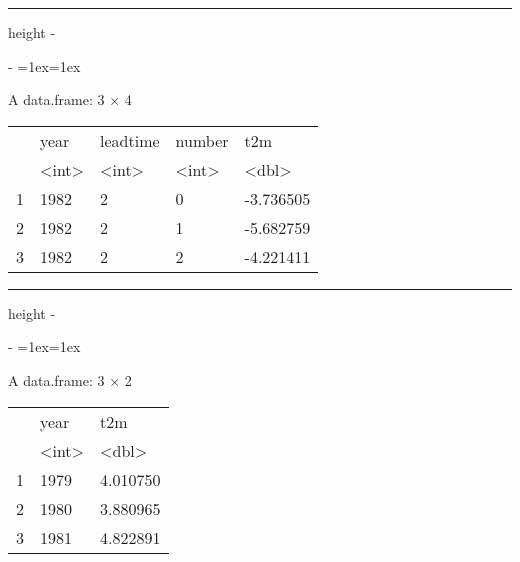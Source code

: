 \documentclass[letterpaper,10pt,english]{sphinxmanual}
\makeatletter
\newenvironment{nbsphinxfancyoutput}{%
    \let\sphinxincludegraphics\nbsphinxincludegraphics
    \nbsphinx@image@maxheight\textheight
    \advance\nbsphinx@image@maxheight -2\fboxsep   %
    \advance\nbsphinx@image@maxheight -2\fboxrule  %
    \advance\nbsphinx@image@maxheight -\baselineskip
\def\nbsphinxfcolorbox{\spx@fcolorbox{nbsphinx-code-border}{white}}%
\def\FrameCommand{\nbsphinxfcolorbox\nbsphinxfancyaddprompt\@empty}%
\def\FirstFrameCommand{\nbsphinxfcolorbox\nbsphinxfancyaddprompt\sphinxVerbatim@Continues}%
\def\MidFrameCommand{\nbsphinxfcolorbox\sphinxVerbatim@Continued\sphinxVerbatim@Continues}%
\def\LastFrameCommand{\nbsphinxfcolorbox\sphinxVerbatim@Continued\@empty}%
\MakeFramed{\advance\hsize-\width\@totalleftmargin\z@\linewidth\hsize\@setminipage}%
\lineskip=1ex\lineskiplimit=1ex\raggedright%
}{\par\unskip\@minipagefalse\endMakeFramed}
\def\nbsphinxfancyaddprompt{\ifvoid\nbsphinxpromptbox\else
    \kern\fboxrule\kern\fboxsep
    \copy\nbsphinxpromptbox
    \kern-\ht\nbsphinxpromptbox\kern-\dp\nbsphinxpromptbox
    \kern-\fboxsep\kern-\fboxrule\nointerlineskip
    \fi}
\newlength\nbsphinxcodecellspacing
\newcommand*{\nbsphinxincludegraphics}[2][]{%
    \gdef\spx@includegraphics@options{#1}%
    \setbox\spx@image@box\hbox{\texttt{[image: \#2]}}%
    \in@false
    \ifdim \wd\spx@image@box>\linewidth
      \g@addto@macro\spx@includegraphics@options{,width=\linewidth}%
      \in@true
    \fi
    \ifdim \ht\spx@image@box>\nbsphinx@image@maxheight
      \g@addto@macro\spx@includegraphics@options{,height=\nbsphinx@image@maxheight}%
      \in@true
    \fi
    \ifin@
      \g@addto@macro\spx@includegraphics@options{,keepaspectratio}%
    \fi
    \setbox\spx@image@box\box\voidb@x %
    \expandafter\includegraphics\expandafter[\spx@includegraphics@options]{#2}%
}%
\makeatother
\begin{document}
\hrule height -\fboxrule\relax
\vspace{\nbsphinxcodecellspacing}

\makeatletter\setbox\nbsphinxpromptbox\box\voidb@x\makeatother

\begin{nbsphinxfancyoutput}
A data.frame: 3 × 4
\begin{tabular}{r|llll}
  & year & leadtime & number & t2m\\
  & <int> & <int> & <int> & <dbl>\\
\hline
    1 & 1982 & 2 & 0 & -3.736505\\
    2 & 1982 & 2 & 1 & -5.682759\\
    3 & 1982 & 2 & 2 & -4.221411\\
\end{tabular}
\end{nbsphinxfancyoutput}

\hrule height -\fboxrule\relax
\vspace{\nbsphinxcodecellspacing}

\makeatletter\setbox\nbsphinxpromptbox\box\voidb@x\makeatother

\begin{nbsphinxfancyoutput}
A data.frame: 3 × 2
\begin{tabular}{r|ll}
  & year & t2m\\
  & <int> & <dbl>\\
\hline
    1 & 1979 & 4.010750\\
    2 & 1980 & 3.880965\\
    3 & 1981 & 4.822891\\
\end{tabular}
\end{nbsphinxfancyoutput}

{
\begin{sphinxVerbatim}[commandchars=\\\{\}]
\llap{\color{nbsphinxin}[7]:\,\hspace{\fboxrule}\hspace{\fboxsep}}   
   
\end{sphinxVerbatim}
}
\end{document}
